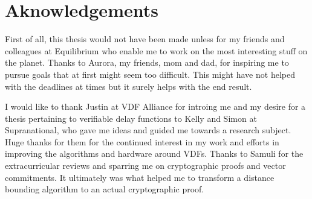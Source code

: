 \chapter{Aknowledgements}
\label{Aknowledgements}
First of all, this thesis would not have been made unless for my friends and colleagues at Equilibrium who enable me to work on the most interesting stuff on the planet. Thanks to Aurora, my friends, mom and dad, for inspiring me to pursue goals that at first might seem too difficult. This might have not helped with the deadlines at times but it surely helps with the end result.

I would like to thank Justin at VDF Alliance for introing me and my desire for a thesis pertaining to verifiable delay functions to Kelly and Simon at Supranational, who gave me ideas and guided me towards a research subject. Huge thanks for them for the continued interest in my work and efforts in improving the algorithms and hardware around VDFs. Thanks to Samuli for the extracurricular reviews and sparring me on cryptographic proofs and vector commitments. It ultimately was what helped me to transform a distance bounding algorithm to an actual cryptographic proof.
